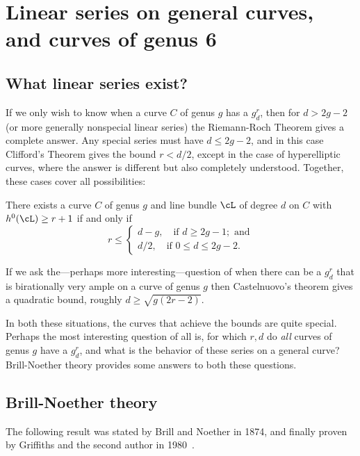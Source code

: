 

\chapter{Linear series on general curves, and curves of genus 6}\label{Brill-Noether}\label{BNChapter}

\section{What linear series exist?}

If we only wish to know when a curve $C$ of genus $g$ has a $g^r_d$, then for $d>2g-2$ (or more generally nonspecial linear series) the Riemann-Roch Theorem gives a complete answer. Any special series must have $d\leq2g-2$, and in this case Clifford's Theorem gives the bound $r< d/2$, except in the case of hyperelliptic curves, where the answer is different but also completely understood. Together, these cases cover all possibilities:

\begin{theorem}\label{arbitrary linear series}
There exists a curve $C$ of genus $g$ and line bundle $\cL$ of degree $d$ on $C$ with $h^0(\cL) \geq r+1$ if and only if
$$
r \leq
\begin{cases}
d-g, \quad \text{if } d \geq 2g-1; \text{ and} \\
d/2,  \quad \text{if } 0 \leq d \leq 2g-2.
\end{cases}
$$
\end{theorem}


If we ask the---perhaps more interesting---question of when there can be a $g^r_d$ that is birationally
very ample on a curve of genus $g$ then Castelnuovo's theorem gives a quadratic bound, roughly $d \geq \sqrt{g(2r-2)}$.

In both these situations, the curves that achieve the bounds are quite special. Perhaps the most interesting question of all is, for which $r,d$ do \emph{all} curves of genus $g$ have a $g^r_d$, and what is the
behavior of these series on a general curve? Brill-Noether theory provides some answers to both these questions.

\section{Brill-Noether theory}

The following result was stated by Brill and Noether in 1874, and finally proven by
Griffiths and the second author in 1980~\cite{Griffiths-Harris-BN}.

